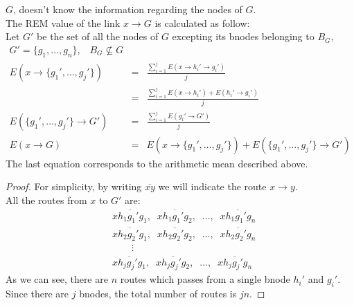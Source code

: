 \documentclass[a4paper]{article}
\begin{document}
\begin{enumerate}
		$G$,  doesn't know the information regarding the nodes of
		$G$.\\
		The REM value of the link $x\rightarrow G$ is calculated as
		follow:\\
		Let $G'$ be the set of all the nodes of $G$ excepting its
		bnodes belonging to $B_G$,
		\begin{eqnarray*}
		G'=\{g_1,\dots,g_n\},\;\;\;B_G \nsubseteq G\\
		E(x \rightarrow \{g_1',\dots,g_j'\})&=&
				\frac{\sum_{i=1}^j E(x \rightarrow h_i' \rightarrow g_i')}
						{j}\\
				&=&
				\frac{\sum_{i=1}^j E(x \rightarrow
				h_i')+E(h_i' \rightarrow g_i')}{j}\\
		E(\{g_1',\dots,g_j'\}\rightarrow G')&=&
				\frac{\sum_{i=1}^j E(g_i'\rightarrow G')}{j}\\
		E(x\rightarrow G)&=&
			E(x \rightarrow \{g_1',\dots,g_j'\}) + E(\{g_1',\dots,g_j'\}\rightarrow G')
		\end{eqnarray*}
		The last equation corresponds to the arithmetic mean described
		above.
		\begin{proof}
			For simplicity, by writing $\overline{xy}$ we will indicate the route $x
			\rightarrow y$.\\
			All the routes from $x$ to $G'$ are:
			\begin{align*}
				&\overline{x h_1  g_1'  g_1},\;\; \overline{x
				h_1  g_1'g_2},\;\;\dots,\;\; \overline{x h_1
				g_1'  g_n}\\
				&\overline{x h_2  g_2'  g_1},\;\; \overline{x
				h_2  g_2'g_2},\;\;\dots,\;\; \overline{x h_2
				g_2'  g_n}\\
				&\qquad \vdots\\
				&\overline{x h_j  g_j'  g_1},\;\; \overline{x
				h_j  g_j'g_2},\;\;\dots,\;\; \overline{x h_j
				g_j'  g_n}
			\end{align*}
			As we can see, there are $n$ routes which passes from
			a single bnode $h_i'$ and $g_i'$. Since there are $j$
			bnodes, the total number of routes is $jn$.


\end{proof}
\end{enumerate}
\end{document}
